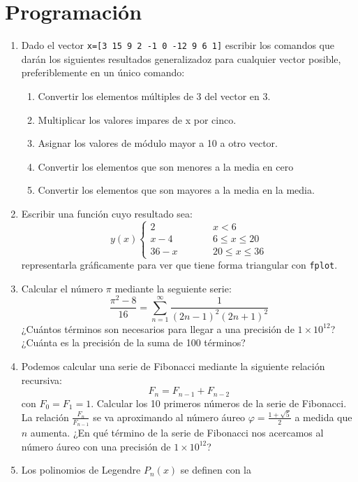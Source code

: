 \section{Programación}

\begin{enumerate}
\item Dado el vector \texttt{x={[}3 15 9 2 -1 0 -12 9 6 1{]}} escribir
  los comandos que darán los siguientes resultados generalizadoz para
  cualquier vector posible, preferiblemente en un único comando:

  \begin{enumerate}
  \item Convertir los elementos múltiples de 3 del vector en 3.
  \item Multiplicar los valores impares de x por cinco.
  \item Asignar los valores de módulo mayor a 10 a otro vector.
  \item Convertir los elementos que son menores a la media en cero
  \item Convertir los elementos que son mayores a la media en la
    media.
  \end{enumerate}
\item Escribir una función cuyo resultado sea:
$$ y(x)\left\{
    \begin{array}{ccc}
      2 & \qquad & x<6\\
      x-4 & \qquad & 6\leq x\leq20\\
      36-x & \qquad & 20\leq x\leq36\end{array}\right.$$
 representarla
  gráficamente para ver que tiene forma triangular con \texttt{fplot}.
\item Calcular el número $\pi$ mediante la seguiente serie:
$$\frac{\pi^{2}-8}{16}=\sum_{n=1}^{\infty}\frac{1}{(2n-1)^{2}(2n+1)^{2}}$$
  ¿Cuántos términos son necesarios para llegar a una precisión de
  $1\times10^{12}$?  ¿Cuánta es la precisión de la suma de 100
  términos?
\item Podemos calcular una serie de Fibonacci mediante la siguiente
  relación recursiva:
$$ F_{n}=F_{n-1}+F_{n-2}$$
con $F_{0}=F_{1}=1$.
  Calcular los 10 primeros números de la serie de Fibonacci. La
  relación $\frac{F_{n}}{F_{n-1}}$ se va aproximando al número áureo
  $\varphi=\frac{1+\sqrt{5}}{2}$ a medida que $n$ aumenta. ¿En qué
  término de la serie de Fibonacci nos acercamos al número áureo con
  una precisión de $1\times10^{12}$?
\item Los polinomios de Legendre $P_{n}(x)$ se definen con la

\end{enumerate}
